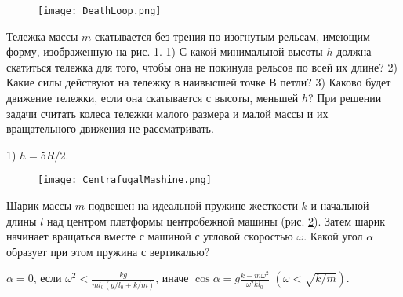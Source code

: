 \begin{ex} %

\begin{figure}[h]
\centering
\texttt{[image: DeathLoop.png]}
\caption{}
\label{DeathLoop}
\end{figure}

Тележка массы $m$ скатывается без трения по изогнутым рельсам, имеющим форму, изображенную на рис. \ref{DeathLoop}. 1) С какой минимальной высоты $h$ должна скатиться тележка для того, чтобы она не покинула рельсов по всей их длине? 2) Какие силы действуют на тележку в наивысшей точке $В$ петли? 3) Каково будет движение тележки, если она скатывается с высоты, меньшей $h$? При решении задачи считать колеса тележки малого размера и малой массы и их вращательного движения не рассматривать.
\begin{ans}
1) $h=5R/2$.
\end{ans}
\end{ex}	

\begin{ex} %

\begin{figure}[h]
\centering
\texttt{[image: CentrafugalMashine.png]}
\caption{}
\label{CentrafugalMashine}
\end{figure}

Шарик массы $m$ подвешен на идеальной пружине жесткости $k$ и начальной длины $l$ над центром платформы центробежной машины (рис. \ref{CentrafugalMashine}). Затем шарик начинает вращаться вместе с машиной с угловой скоростью $\omega$. Какой угол $\alpha$ образует при этом пружина с вертикалью?

\begin{ans}
$\alpha = 0$, если $\omega^2 < \frac{kg}{ml_0(g/l_0 + k/m)}$, иначе $\cos \alpha = g\frac{k-m\omega^2}{\omega^2kl_0}$ $\left( \omega < \sqrt{k/m} \right)$.
\end{ans}
\end{ex}	

\clearpage